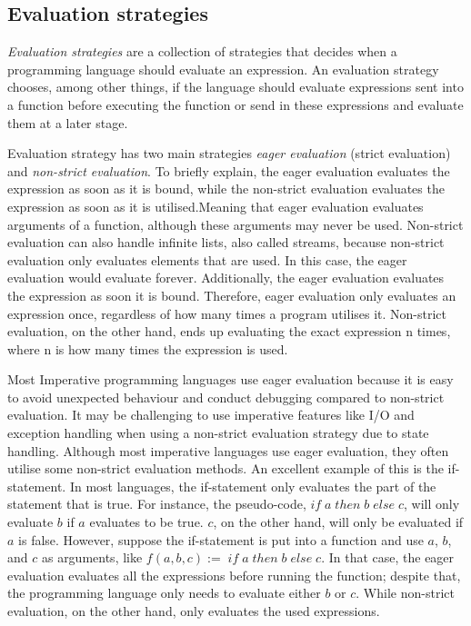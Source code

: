 \subsection{Evaluation strategies}
\emph{Evaluation strategies} are a collection of strategies that decides when a programming language should evaluate an expression. An evaluation strategy chooses, among other things, if the language should evaluate expressions sent into a function before executing the function or send in these expressions and evaluate them at a later stage.

\para
Evaluation strategy has two main strategies \emph{eager evaluation} (strict evaluation) and \emph{non-strict evaluation}. To briefly explain, the eager evaluation evaluates the expression as soon as it is bound, while the non-strict evaluation evaluates the expression as soon as it is utilised.Meaning that eager evaluation evaluates arguments of a function, although these arguments may never be used. Non-strict evaluation can also handle infinite lists, also called streams, because non-strict evaluation only evaluates elements that are used. In this case, the eager evaluation would evaluate forever. Additionally, the eager evaluation evaluates the expression as soon it is bound. Therefore, eager evaluation only evaluates an expression once, regardless of how many times a program utilises it. Non-strict evaluation, on the other hand, ends up evaluating the exact expression n times, where n is how many times the expression is used.

\para
Most Imperative programming languages use eager evaluation because it is easy to avoid unexpected behaviour and conduct debugging compared to non-strict evaluation. It may be challenging to use imperative features like I/O and exception handling when using a non-strict evaluation strategy due to state handling. Although most imperative languages use eager evaluation, they often utilise some non-strict evaluation methods. An excellent example of this is the if-statement. In most languages, the if-statement only evaluates the part of the statement that is true. For instance, the pseudo-code, $if\; a\; then\; b\; else\; c$, will only evaluate $b$ if $a$ evaluates to be true. $c$, on the other hand, will only be evaluated if $a$ is false. However, suppose the if-statement is put into a function and use $a$, $b$, and $c$ as arguments, like $f(a, b,c):= \; if\; a\; then\; b\; else\; c$. In that case, the eager evaluation evaluates all the expressions before running the function; despite that, the programming language only needs to evaluate either $b$ or $c$. While non-strict evaluation, on the other hand, only evaluates the used expressions.

